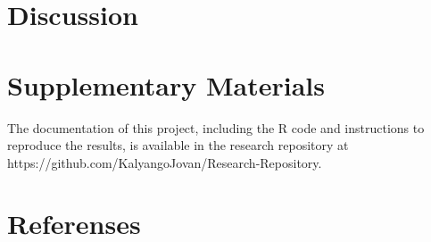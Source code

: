 \documentclass{article}
\begin{document}
\section{Discussion}



\section*{Supplementary Materials}
The documentation of this project, including the R code and instructions to reproduce the results,
is available in the research repository at https://github.com/KalyangoJovan/Research-Repository.



 
\section{Referenses} 
\printbibliography
\end{document}
